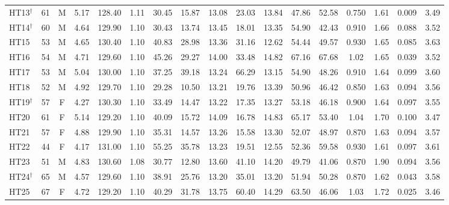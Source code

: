 \begin{table}[H]
{\begin{tabular}{lcccccccccccccccc}
HT13$^\dagger$ & 61 & M & 5.17 & 128.40 & 1.11 & 30.45 & 15.87 & 13.08 & 23.03 & 13.84 & 47.86 & 52.58 & 0.750 & 1.61 & 0.009 & 3.49\\
HT14$^\dagger$ & 60 & M & 4.64 & 129.90 & 1.10 & 30.43 & 13.74 & 13.45 & 18.01 & 13.35 & 54.90 & 42.43 & 0.910 & 1.66 & 0.088 & 3.52\\
HT15 & 53 & M & 4.65 & 130.40 & 1.10 & 40.83 & 28.98 & 13.36 & 31.16 & 12.62 & 54.44 & 49.57 & 0.930 & 1.65 & 0.085 & 3.63\\
HT16 & 54 & M & 4.71 & 129.60 & 1.10 & 45.26 & 29.27 & 14.00 & 33.48 & 14.82 & 67.16 & 67.68 & 1.02 & 1.65 & 0.039 & 3.52\\
HT17 & 53 & M & 5.04 & 130.00 & 1.10 & 37.25 & 39.18 & 13.24 & 66.29 & 13.15 & 54.90 & 48.26 & 0.910 & 1.64 & 0.099 & 3.60\\
HT18 & 52 & M & 4.92 & 129.70 & 1.10 & 29.28 & 10.50 & 13.21 & 19.76 & 13.39 & 50.96 & 46.42 & 0.850 & 1.63 & 0.094 & 3.56\\
HT19$^\dagger$ & 57 & F & 4.27 & 130.30 & 1.10 & 33.49 & 14.47 & 13.22 & 17.35 & 13.27 & 53.18 & 46.18 & 0.900 & 1.64 & 0.097 & 3.55\\
HT20 & 61 & F & 5.14 & 129.20 & 1.10 & 40.09 & 15.72 & 14.09 & 16.78 & 14.83 & 65.17 & 53.40 & 1.04 & 1.70 & 0.100 & 3.47\\
HT21 & 57 & F & 4.88 & 129.90 & 1.10 & 35.31 & 14.57 & 13.26 & 15.58 & 13.30 & 52.07 & 48.97 & 0.870 & 1.63 & 0.094 & 3.57\\
HT22 & 44 & F & 4.17 & 131.00 & 1.10 & 55.25 & 35.78 & 13.23 & 19.51 & 12.55 & 52.36 & 59.58 & 0.930 & 1.61 & 0.097 & 3.61\\
HT23 & 51 & M & 4.83 & 130.60 & 1.08 & 30.77 & 12.80 & 13.60 & 41.10 & 14.20 & 49.79 & 41.06 & 0.870 & 1.90 & 0.094 & 3.56\\
HT24$^\dagger$ & 65 & M & 4.57 & 129.60 & 1.10 & 38.91 & 25.76 & 13.20 & 35.01 & 13.20 & 51.94 & 50.28 & 0.870 & 1.62 & 0.043 & 3.58\\
HT25 & 67 & F & 4.72 & 129.20 & 1.10 & 40.29 & 31.78 & 13.75 & 60.40 & 14.29 & 63.50 & 46.06 & 1.03 & 1.72 & 0.025 & 3.46\\
\bottomrule\end{tabular}}
\end{table}

